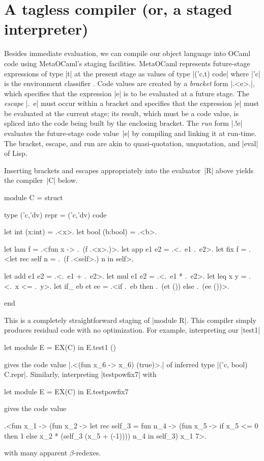 \documentclass[preprint]{sigplanconf}
\begin{document}
\section{A tagless compiler (or, a staged interpreter)}\label{compiler}

Besides immediate evaluation, we can compile our object language
into OCaml code using MetaOCaml's staging facilities. MetaOCaml
represents future-stage expressions of type |t| at the
present stage as values of type |('c,t) code| where |'c| is the
environment classifier \citep{WalidPOPL03,calcagno-ml-like}. Code values are created
by a \emph{bracket} form |.<e>.|, which specifies that the expression |e| is to be
evaluated at a future stage. The \emph{escape} |.~e| must occur
within a bracket and specifies that the expression |e| must be evaluated
at the current stage; its result, which must be a code value, is
spliced into the code being built by the enclosing bracket. The \emph{run} form |.!e| evaluates
the future-stage code value~|e| by compiling and linking it at run-time.
The bracket, escape, and run are akin to
quasi-quotation, unquotation, and |eval| of Lisp.

Inserting brackets and escapes appropriately into the
evaluator~|R| above yields the compiler~|C| below.
\begin{code}
module C = struct

  type ('c,'dv) repr = ('c,'dv) code

  let int (x:int)   = .<x>.
  let bool (b:bool) = .<b>.

  let lam f         = .<fun x -> .~(f .<x>.)>.
  let app e1 e2     = .<.~e1 .~e2>.
  let fix f = 
    .<let rec self n = .~(f .<self>.) n in self>.

  let add e1 e2     = .<.~e1 + .~e2>.
  let mul e1 e2     = .<.~e1 * .~e2>.
  let leq x y       = .<.~x <= .~y>.
  let if_ eb et ee = 
    .<if .~eb then .~(et ()) else .~(ee ())>.

end
\end{code}
This is a completely straightforward staging of
|module R|.
This compiler simply produces
residual code with no optimization. For example, interpreting our |test1|
\begin{code}
let module E = EX(C) in E.test1 ()
\end{code}
gives the code value |.<(fun x_6 -> x_6) (true)>.|
of inferred type |('c, bool) C.repr|.  Similarly, interpreting |testpowfix7|
with
\begin{code}
let module E = EX(C) in E.testpowfix7
\end{code}
gives the code value
\begin{code}
.<fun x_1 -> (fun x_2 ->
  let rec self_3 = fun n_4 ->
   (fun x_5 -> if x_5 <= 0 then 1 
               else x_2 * (self_3 (x_5 + (-1))))
   n_4
  in self_3) x_1 7>.
\end{code}
with many apparent $\beta$-redexes.
\end{document}
